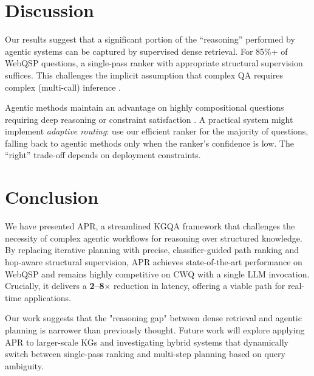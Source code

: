 \documentclass[conference]{IEEEtran}
\newcommand{\model}{\textsc{APR}}
\begin{document}
\section{Discussion}

Our results suggest that a significant portion of the “reasoning” performed by agentic systems can be captured by supervised dense retrieval. For 85\%+ of WebQSP questions, a single-pass ranker with appropriate structural supervision suffices. This challenges the implicit assumption that complex QA requires complex (multi-call) inference \cite{wei2022cot, yao2023tot}.

Agentic methods maintain an advantage on highly compositional questions requiring deep reasoning or constraint satisfaction \cite{talmor2018cwq}. A practical system might implement \emph{adaptive routing}: use our efficient ranker for the majority of questions, falling back to agentic methods only when the ranker's confidence is low. The “right” trade-off depends on deployment constraints.

\section{Conclusion}

We have presented \model{}, a streamlined KGQA framework that challenges the necessity of complex agentic workflows for reasoning over structured knowledge. By replacing iterative planning with precise, classifier-guided path ranking and hop-aware structural supervision, \model{} achieves state-of-the-art performance on WebQSP and remains highly competitive on CWQ with a single LLM invocation. Crucially, it delivers a \textbf{2--8$\times$} reduction in latency, offering a viable path for real-time applications.

Our work suggests that the "reasoning gap" between dense retrieval and agentic planning is narrower than previously thought. Future work will explore applying \model{} to larger-scale KGs and investigating hybrid systems that dynamically switch between single-pass ranking and multi-step planning based on query ambiguity.



\end{document}
